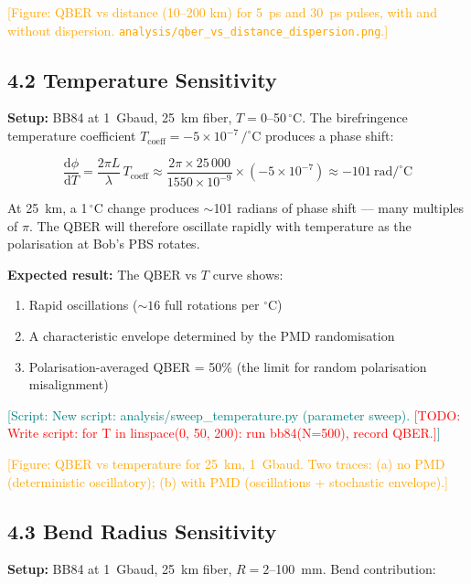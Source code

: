 \documentclass[11pt,a4paper]{article}
\newcommand{\todo}[1]{\textcolor{red}{[TODO: #1]}}
\newcommand{\scriptref}[1]{\textcolor{teal}{[Script: #1]}}
\newcommand{\figref}[1]{\textcolor{orange}{[Figure: #1]}}
\begin{document}
\figref{QBER vs distance (10--200 km) for 5~ps and 30~ps pulses, with
  and without dispersion.  {\tt analysis/qber\_vs\_distance\_dispersion.png}.}

\subsection{4.2 Temperature Sensitivity}
\label{sec:qber-temp}

\textbf{Setup:} BB84 at 1~Gbaud, 25~km fiber, $T = 0$--50$\,^\circ$C.
The birefringence temperature coefficient
$T_{\text{coeff}} = -5\times10^{-7}\,/^\circ$C produces a phase shift:

\begin{equation}
  \frac{\mathrm{d}\phi}{\mathrm{d}T}
    = \frac{2\pi L}{\lambda}\,T_{\text{coeff}}
    \approx \frac{2\pi \times 25\,000}{1550\times10^{-9}}
    \times (-5\times10^{-7})
    \approx -101~\text{rad}/^\circ\text{C}
\end{equation}

At 25~km, a 1$\,^\circ$C change produces $\sim$101 radians of phase
shift --- many multiples of $\pi$.  The QBER will therefore oscillate
rapidly with temperature as the polarisation at Bob's PBS rotates.

\textbf{Expected result:} The QBER vs $T$ curve shows:
\begin{enumerate}[nosep]
  \item Rapid oscillations ($\sim 16$ full rotations per $^\circ$C)
  \item A characteristic envelope determined by the PMD randomisation
  \item Polarisation-averaged QBER = 50\% (the limit for random
    polarisation misalignment)
\end{enumerate}

\scriptref{New script: analysis/sweep\_temperature.py (parameter sweep).
  \todo{Write script: for T in linspace(0, 50, 200): run bb84(N=500),
    record QBER.}}

\figref{QBER vs temperature for 25~km, 1~Gbaud.  Two traces: (a) no
  PMD (deterministic oscillatory); (b) with PMD (oscillations +
  stochastic envelope).}

\subsection{4.3 Bend Radius Sensitivity}
\label{sec:qber-bend}

\textbf{Setup:} BB84 at 1~Gbaud, 25~km fiber, $R = 2$--100~mm.
Bend contribution:
\end{document}
